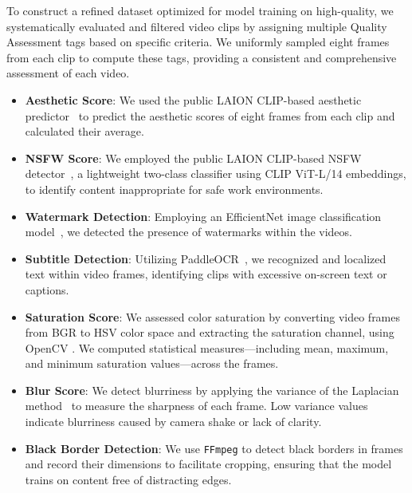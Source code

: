 To construct a refined dataset optimized for model training on high-quality, we systematically evaluated and filtered video clips by assigning multiple Quality Assessment tags based on specific criteria. We uniformly sampled eight frames from each clip to compute these tags, providing a consistent and comprehensive assessment of each video.

\begin{itemize}[left=0cm]
\item \textbf{Aesthetic Score}: We used the public LAION CLIP-based aesthetic predictor~\cite{schuhmann2022laion} to predict the aesthetic scores of eight frames from each clip and calculated their average.

\item \textbf{NSFW Score}: We employed the public LAION CLIP-based NSFW detector~\cite{laion2021nsfw}, a lightweight two-class classifier using CLIP ViT-L/14 embeddings, to identify content inappropriate for safe work environments.

\item \textbf{Watermark Detection}: Employing an EfficientNet image classification model~\cite{tan2019efficientnet}, we detected the presence of watermarks within the videos.

\item \textbf{Subtitle Detection}: Utilizing PaddleOCR~\cite{paddleocr}, we recognized and localized text within video frames, identifying clips with excessive on-screen text or captions.

\item \textbf{Saturation Score}: 
We assessed color saturation by converting video frames from BGR to HSV color space and extracting the saturation channel, using OpenCV \cite{opencv_library}. We computed statistical measures—including mean, maximum, and minimum saturation values—across the frames. 


\item \textbf{Blur Score}: 
We detect blurriness by applying the variance of the Laplacian method~\cite{pech2000diatom} to measure the sharpness of each frame. Low variance values indicate blurriness caused by camera shake or lack of clarity.

\item \textbf{Black Border Detection}: We use \texttt{FFmpeg} to detect black borders in frames and record their dimensions to facilitate cropping, ensuring that the model trains on content free of distracting edges.
\end{itemize}



